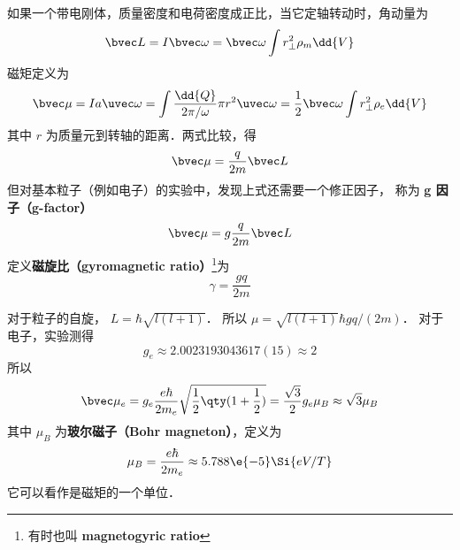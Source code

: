


如果一个带电刚体，质量密度和电荷密度成正比，当它定轴转动时，角动量为
\begin{equation}
\bvec L = I\bvec \omega  = \bvec \omega \int r_\bot^2 \rho_m \dd{V}
\end{equation}
磁矩定义为
\begin{equation}
\bvec \mu  = Ia \uvec\omega = \int \frac{\dd{Q}}{2\pi/\omega}  \pi r^2 \uvec \omega
= \frac12 \bvec \omega \int r_\bot^2\rho_e \dd{V} 
\end{equation}
其中 $r$ 为质量元到转轴的距离．两式比较，得
\begin{equation}
\bvec \mu  = \frac{q}{2m} \bvec L
\end{equation}
但对基本粒子（例如电子）的实验中，发现上式还需要一个修正因子， 称为 \textbf{g 因子（g-factor）}
\begin{equation}
\bvec \mu  = g\frac{q}{2m}\bvec L
\end{equation}
定义\textbf{磁旋比（gyromagnetic ratio）}\footnote{有时也叫 \textbf{magnetogyric ratio}}为
\begin{equation}
\gamma  = \frac{gq}{2m}
\end{equation}

对于粒子的自旋， $L = \hbar \sqrt{l(l + 1)} $． 所以 $\mu = \sqrt{l (l + 1)} \hbar gq/(2m)$． 
对于电子，实验测得
\begin{equation}
g_e \approx 2.0023193043617(15) \approx 2
\end{equation}
所以
\begin{equation}
\bvec \mu_e  = g_e \frac{e\hbar}{2 m_e} \sqrt{\frac12 \qty(1 + \frac12)}  = \frac{\sqrt 3}{2} g_e \mu_B \approx \sqrt 3 \mu_B
\end{equation}
其中 $\mu_B$ 为\textbf{玻尔磁子（Bohr magneton）}，定义为
\begin{equation}
\mu_B = \frac{e\hbar}{2 m_e} \approx 5.788\e{-5} \Si{eV/T}
\end{equation}
它可以看作是磁矩的一个单位．

